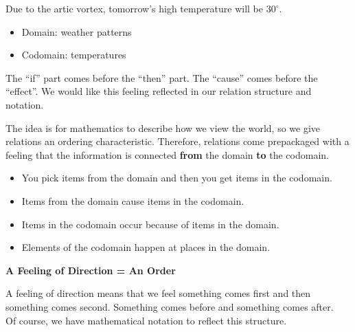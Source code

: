 \documentclass{ximera}
\begin{document}
\begin{idea}
Due to the artic vortex, tomorrow's high temperature will be $30^{\circ}$. \\

\begin{itemize}
    \item Domain: weather patterns
    \item Codomain: temperatures
\end{itemize}

\end{idea}

The ``if'' part comes before the ``then'' part.  The ``cause'' comes before the ``effect''.  We would like this feeling reflected in our relation structure and notation.  


The idea is for mathematics to describe how we view the world, so we give relations an ordering characteristic. Therefore, relations come prepackaged with a feeling that the information is connected \textbf{\textcolor{purple!85!blue}{from}} the domain \textbf{\textcolor{purple!85!blue}{to}} the codomain.






\begin{itemize}
\item You pick items from the domain and then you get items in the codomain.
\item Items from the domain cause items in the codomain.
\item Items in the codomain occur because of items in the domain.
\item Elements of the codomain happen at places in the domain.
\end{itemize}




\textbf{\textcolor{red!80!black}{A Feeling of Direction = An Order}}

A feeling of direction means that we feel something comes first and then something comes second.  Something comes before and something comes after. \\


Of course, we have mathematical notation to reflect this structure. \\
\end{document}
